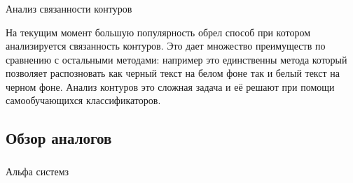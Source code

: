 \subsubsection{}
\label{sub:domain:recognition:contour_anolisys}
Анализ связанности контуров

На текущим момент большую популярность обрел способ при котором анализируется связанность контуров. Это дает множество преимуществ по сравнению с остальными методами: например это единственны метода который позволяет распозновать как черный текст на белом фоне так и белый текст на черном фоне. Анализ контуров это сложная задача и её решают при помощи самообучающихся классификаторов.  


\subsection{Обзор аналогов}
\label{sub:domain:analogs}

\subsubsection{}
\label{sub:domain:analogs:alpha_systems}
Альфа системз

